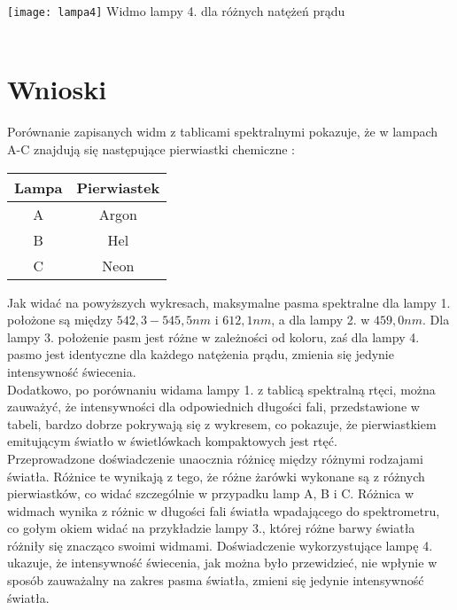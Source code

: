 \documentclass[10pt,a4paper]{article}
\newcommand{\forceindent}{\leavevmode{\parindent=3em\indent}}
\begin{document}
\texttt{[image: lampa4]}
Widmo lampy 4. dla różnych natężeń prądu\\
\\

\newpage
\section*{Wnioski}
\forceindent Porównanie zapisanych widm z tablicami spektralnymi pokazuje, że w lampach A-C znajdują się następujące pierwiastki chemiczne :

\begin{center}
\begin{tabular}{|c|c|}
\hline
\textbf{Lampa} & \textbf{Pierwiastek} \\
\hline
A & Argon \\
\hline
B & Hel \\
\hline
C & Neon \\
\hline
\end{tabular}
\end{center}

\forceindent Jak widać na powyższych wykresach, maksymalne pasma spektralne dla lampy 1. położone są między $ 542,3 - 545,5 nm$ i $612,1 nm$, a dla lampy 2. w $459,0 nm$. Dla lampy 3. położenie pasm jest różne w zależności od koloru, zaś dla lampy 4. pasmo jest identyczne dla każdego natężenia prądu, zmienia się jedynie intensywność świecenia.\\

\forceindent Dodatkowo, po porównaniu widama lampy 1. z tablicą spektralną rtęci, można zauważyć, że intensywności dla odpowiednich długości fali, przedstawione w tabeli, bardzo dobrze pokrywają się z wykresem, co pokazuje, że pierwiastkiem emitującym światło w świetlówkach kompaktowych jest rtęć. \\

\forceindent Przeprowadzone doświadczenie unaocznia różnicę między różnymi rodzajami światła. Różnice te wynikają z tego, że różne żarówki wykonane są z różnych pierwiastków, co widać szczególnie w przypadku lamp A, B i C. Różnica w widmach wynika z różnic w długości fali światła wpadającego do spektrometru, co gołym okiem widać na przykładzie lampy 3., której różne barwy światła różniły się znacząco swoimi widmami. Doświadczenie wykorzystujące lampę 4. ukazuje, że intensywność świecenia, jak można było przewidzieć, nie wpłynie w sposób zauważalny na zakres pasma światła, zmieni się jedynie intensywność światła.
\end{document}
